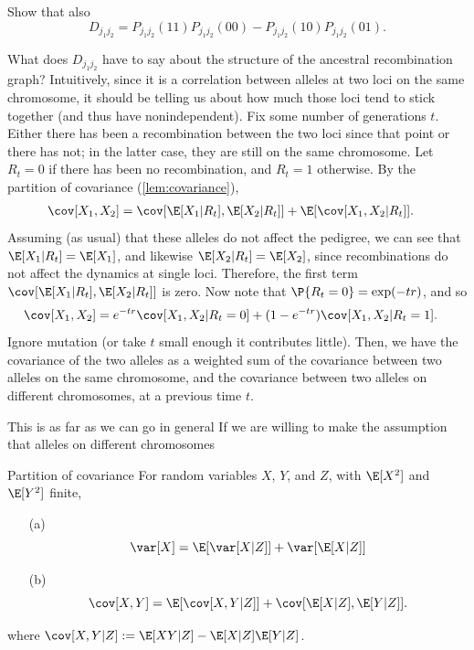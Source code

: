 \begin{exercise}
  Show that also
  \[ D_{j_1 j_2} = P_{j_1 j_2}(11) P_{j_1 j_2}(00) - P_{j_1 j_2}(10) P_{j_1 j_2}(01) .  \]
\end{exercise}

What does $D_{j_1 j_2}$ have to say about the structure of the ancestral recombination graph?
Intuitively, since it is a correlation between alleles at two loci on the same chromosome,
it should be telling us about how much those loci tend to stick together (and thus have nonindependent).
Fix some number of generations $t$.
Either there has been a recombination between the two loci since that point or there has not;
in the latter case, they are still on the same chromosome.
Let $R_t=0$ if there has been no recombination, and $R_t=1$ otherwise.
By the partition of covariance (\ref{lem:covariance}),
\begin{align}
  \cov[X_1,X_2] &= \cov[ \E[X_1|R_t], \E[X_2|R_t] ] + \E[ \cov[X_1,X_2|R_t] ]  .
\end{align}
Assuming (as usual) that these alleles do not affect the pedigree,
we can see that $\E[X_1|R_t] = \E[X_1]$, and likewise $\E[X_2|R_t] = \E[X_2]$,
since recombinations do not affect the dynamics at single loci.
Therefore, the first term $\cov[ \E[X_1|R_t], \E[X_2|R_t] ]$ is zero.
Now note that $\P\{R_t=0\} = \exp(-tr)$, and so
\begin{align}
  \cov[X_1,X_2] &= e^{-tr} \cov[X_1,X_2|R_t=0] + (1-e^{-tr}) \cov[X_1,X_2|R_t=1] .
\end{align}
Ignore mutation (or take $t$ small enough it contributes little).
Then, we have the covariance of the two alleles as a weighted sum of 
the covariance between two alleles on the same chromosome,
and the covariance between two alleles on different chromosomes,
at a previous time $t$.



This is as far as we can go in general
If we are willing to make the assumption that alleles on different chromosomes


\begin{lemma}{Partition of covariance} \label{lem:covariance}
  For random variables $X$, $Y$, and $Z$, with $\E[X^2]$ and $\E[Y^2]$ finite,
  \begin{itemize}
    \item[(a)]
    \[
      \var[X] = \E[ \var[X|Z] ] + \var[ \E[X|Z] ]
    \]
    \item[(b)]
    \[
      \cov[X,Y] = \E[ \cov[X,Y|Z] ] + \cov[ \E[X|Z], \E[Y|Z] ] .
    \]
  \end{itemize}
  where $\cov[X,Y|Z] := \E[XY|Z] - \E[X|Z]\E[Y|Z]$.
\end{lemma}

